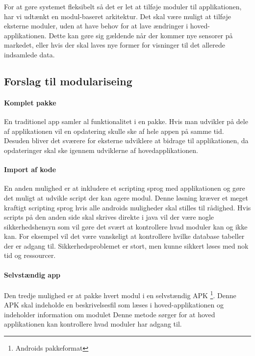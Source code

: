 
For at gøre systemet fleksibelt så det er let at tilføje moduler til applikationen, har vi udtænkt en modul-baseret arkitektur.
Det skal være muligt at tilføje eksterne moduler, uden at have behov for at lave ændringer i hoved-applikationen.
Dette kan gøre sig gældende når der kommer nye sensorer på markedet, eller hvis der skal laves nye former for visninger til det allerede indsamlede data.

\subsection{Forslag til modulariseing}
\paragraph{Komplet pakke}
En traditionel app samler al funktionalitet i en pakke.
Hvis man udvikler på dele af applikationen vil en opdatering skulle ske af hele appen på samme tid.
Desuden bliver det sværere for eksterne udviklere at bidrage til applikationen, da opdateringer skal ske igennem udviklerne af hovedapplikationen.

\paragraph{Import af kode}
En anden mulighed er at inkludere et scripting sprog med applikationen og gøre det muligt at udvikle script der kan agere modul.
Denne løsning kræver et meget kraftigt scripting sprog hvis alle androids muligheder skal stilles til rådighed.
Hvis scripts på den anden side skal skrives direkte i java vil der være nogle sikkerhedshensyn som vil gøre det svært at kontrollere hvad moduler kan og ikke kan.
For eksempel vil det være vanskeligt at kontrollere hvilke database tabeller der er adgang til.
Sikkerhedsproblemet er stort, men kunne sikkert løses med nok tid og ressourcer.

\paragraph{Selvstændig app}
Den tredje mulighed er at pakke hvert modul i en selvstændig APK \footnote{Androids pakkeformat}.
Denne APK skal indeholde en beskrivelsesfil som læses i hoved-applikationen og indeholder information om modulet
Denne metode sørger for at hoved applikationen kan kontrollere hvad moduler har adgang til. 

